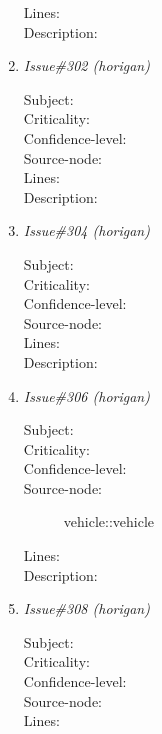 \begin{enumerate}
\begin{description}
\item [Lines:] 

\item [Description:] 
\end{description}
\item {\it Issue\#302 (horigan)}
\begin{description}
\item [Subject:] 
\item [Criticality:] 
\item [Confidence-level:] 
\item [Source-node:] 

\item [Lines:] 

\item [Description:] 
\end{description}
\item {\it Issue\#304 (horigan)}
\begin{description}
\item [Subject:] 
\item [Criticality:] 
\item [Confidence-level:] 
\item [Source-node:] 

\item [Lines:] 

\item [Description:] 
\end{description}
\item {\it Issue\#306 (horigan)}
\begin{description}
\item [Subject:] 
\item [Criticality:] 
\item [Confidence-level:] 
\item [Source-node:] vehicle::vehicle

\item [Lines:] 

\item [Description:] 
\end{description}
\item {\it Issue\#308 (horigan)}
\begin{description}
\item [Subject:] 
\item [Criticality:] 
\item [Confidence-level:] 
\item [Source-node:] 

\item [Lines:] 


\end{description}
\end{enumerate}
